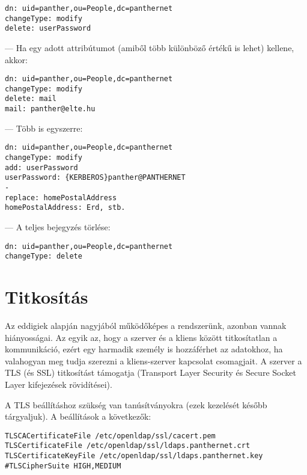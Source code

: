 \begin{Verbatim}[frame=single]
dn: uid=panther,ou=People,dc=panthernet
changeType: modify
delete: userPassword
\end{Verbatim}


\noindent --- Ha egy adott attribútumot (amiből több különböző értékű is lehet) kellene, akkor:

\begin{Verbatim}[frame=single]
dn: uid=panther,ou=People,dc=panthernet
changeType: modify
delete: mail
mail: panther@elte.hu
\end{Verbatim}

\noindent --- Több is egyszerre:

\begin{Verbatim}[frame=single]
dn: uid=panther,ou=People,dc=panthernet
changeType: modify
add: userPassword
userPassword: {KERBEROS}panther@PANTHERNET
-
replace: homePostalAddress
homePostalAddress: Erd, stb.
\end{Verbatim}

\noindent --- A teljes bejegyzés törlése:
  
\begin{Verbatim}[frame=single]
dn: uid=panther,ou=People,dc=panthernet
changeType: delete
\end{Verbatim}



\section{Titkosítás}

Az eddigiek alapján nagyjából működőképes a rendszerünk, azonban vannak
hiányosságai. Az egyik az, hogy a szerver és a kliens között titkosítatlan a kommunikáció, ezért egy harmadik személy
is hozzáférhet az adatokhoz, ha valahogyan meg tudja szerezni a kliens-szerver kapcsolat csomagjait. A szerver a TLS
(és SSL) titkosítást támogatja (Transport Layer Security és Secure Socket Layer kifejezések rövidítései).

A TLS beállításhoz szükség van tanúsítványokra (ezek kezelését később tárgyaljuk). A beállítások a következők:

\begin{Verbatim}[frame=single]
TLSCACertificateFile /etc/openldap/ssl/cacert.pem
TLSCertificateFile /etc/openldap/ssl/ldaps.panthernet.crt
TLSCertificateKeyFile /etc/openldap/ssl/ldaps.panthernet.key
#TLSCipherSuite HIGH,MEDIUM
\end{Verbatim}  

